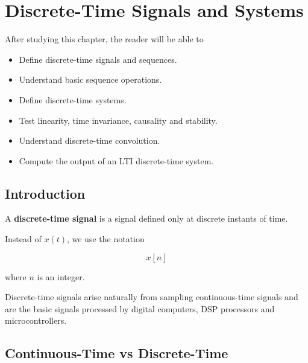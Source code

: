 
\chapter{Discrete-Time Signals and Systems}

\begin{tcolorbox}[colback=blue!5!white,colframe=blue!70!black,title=Learning Objectives]

After studying this chapter, the reader will be able to

\begin{itemize}
\item Define discrete-time signals and sequences.
\item Understand basic sequence operations.
\item Define discrete-time systems.
\item Test linearity, time invariance, causality and stability.
\item Understand discrete-time convolution.
\item Compute the output of an LTI discrete-time system.
\end{itemize}

\end{tcolorbox}


\section{Introduction}

A \textbf{discrete-time signal} is a signal defined only at discrete instants of time.

Instead of \(x(t)\), we use the notation

\[
\boxed{
x[n]
}
\]

where \(n\) is an integer.

Discrete-time signals arise naturally from sampling continuous-time signals and are
the basic signals processed by digital computers, DSP processors and microcontrollers.


\section{Continuous-Time vs Discrete-Time}

